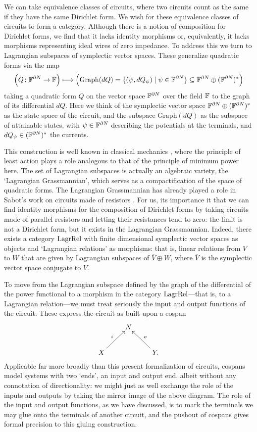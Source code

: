 We can take equivalence classes of circuits, where two circuits count as the
same if they have the same Dirichlet form.  We wish for these equivalence classes of circuits to form a category. Although
there is a notion of composition for Dirichlet forms, we find that it lacks
identity morphisms or, equivalently, it lacks morphisms representing ideal wires
of zero impedance. To address this we turn to Lagrangian subspaces of
symplectic vector spaces.  These generalize quadratic forms via the map
\[
  \Big(Q{\colon} {\mathbb F}^{\partial N} \to {\mathbb F}\Big) \longmapsto \Big(\mathrm{Graph}(dQ) =
  \{(\psi, dQ_\psi) \mid \psi \in {\mathbb F}^{\partial N} \} \subseteq {\mathbb F}^{\partial
  N} \oplus ({\mathbb F}^{\partial N})^\ast\Big)
\]
taking a quadratic form $Q$ on the vector space ${\mathbb F}^{\partial N}$
over the field ${\mathbb F}$ to the graph
of its differential $dQ$. Here we think of the symplectic vector space
${\mathbb F}^{\partial N} \oplus ({\mathbb F}^{\partial N})^\ast$ as the state space of the
circuit, and the subspace $\mathrm{Graph}(dQ)$ as the subspace of attainable
states, with $\psi \in {\mathbb F}^{\partial N}$ describing the potentials at the
terminals, and $dQ_\psi \in ({\mathbb F}^{\partial N})^\ast$ the currents. 

This construction is well known in classical mechanics \cite{Weinstein}, where the principle of least action plays a role analogous to that of the principle of minimum power here.   The set of Lagrangian subspaces is actually an algebraic variety,
the `Lagrangian Grassmannian', which serves as a compactification of the
space of quadratic forms.  The Lagrangian Grassmannian has already played a
role in Sabot's work on circuits made of resistors \cite{Sabot1997,Sabot2004}.
For us, its importance it that we can find identity morphisms
for the composition of Dirichlet forms by taking circuits made of parallel resistors
and letting their resistances tend to zero: the limit is not a Dirichlet form, but
it exists in the Lagrangian Grassmannian.    Indeed, 
there exists a category $\mathrm{LagrRel}$ with finite dimensional
symplectic vector spaces as objects and `Lagrangian relations' as morphisms: 
that is, linear relations from $V$ to $W$ that are given by Lagrangian subspaces of $\overline{V} \oplus W$, where $\overline{V}$ is the symplectic vector space conjugate to $V$.   

To move from the Lagrangian subspace defined by the graph of the differential of
the power functional to a morphism in the category $\mathrm{LagrRel}$---that
is, to a Lagrangian relation---we must treat seriously the input and output
functions of the circuit. These express the circuit as built upon a cospan   
\[
  \xymatrix{
    & N \\
    X \ar[ur]^{i} && Y. \ar[ul]_o
  }
\]
Applicable far more broadly than this present formalization of circuits, cospans
model systems with two `ends', an input and output end, albeit without any
connotation of directionality: we might just as well exchange the role of the
inputs and outputs by taking the mirror image of the above diagram. The role of
the input and output functions, as we have discussed, is to mark the terminals
we may glue onto the terminals of another circuit, and the pushout of cospans
gives formal precision to this gluing construction.

